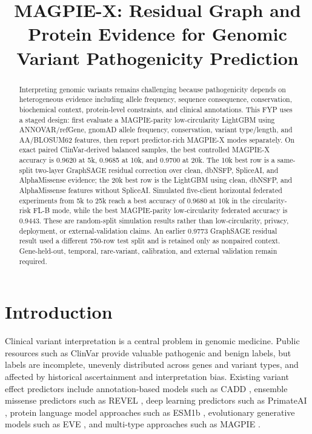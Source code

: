 \documentclass[conference]{IEEEtran}
\title{MAGPIE-X: Residual Graph and Protein Evidence for Genomic Variant Pathogenicity Prediction}
\author{
\IEEEauthorblockN{Omar}
\IEEEauthorblockA{Final Year Project Draft\\
Department / University Name\\
Email: student@example.com}
}
\begin{document}
\maketitle

\begin{abstract}
Interpreting genomic variants remains challenging because pathogenicity depends on heterogeneous evidence including allele frequency, sequence consequence, conservation, biochemical context, protein-level constraints, and clinical annotations. This FYP uses a staged design: first evaluate a MAGPIE-parity low-circularity LightGBM using ANNOVAR/refGene, gnomAD allele frequency, conservation, variant type/length, and AA/BLOSUM62 features, then report predictor-rich MAGPIE-X modes separately. On exact paired ClinVar-derived balanced samples, the best controlled MAGPIE-X accuracy is 0.9620 at 5k, 0.9685 at 10k, and 0.9700 at 20k. The 10k best row is a same-split two-layer GraphSAGE residual correction over clean, dbNSFP, SpliceAI, and AlphaMissense evidence; the 20k best row is the LightGBM using clean, dbNSFP, and AlphaMissense features without SpliceAI. Simulated five-client horizontal federated experiments from 5k to 25k reach a best accuracy of 0.9680 at 10k in the circularity-risk FL-B mode, while the best MAGPIE-parity low-circularity federated accuracy is 0.9443. These are random-split simulation results rather than low-circularity, privacy, deployment, or external-validation claims. An earlier 0.9773 GraphSAGE residual result used a different 750-row test split and is retained only as nonpaired context. Gene-held-out, temporal, rare-variant, calibration, and external validation remain required.
\end{abstract}

\section{Introduction}
Clinical variant interpretation is a central problem in genomic medicine. Public resources such as ClinVar provide valuable pathogenic and benign labels, but labels are incomplete, unevenly distributed across genes and variant types, and affected by historical ascertainment and interpretation bias. Existing variant effect predictors include annotation-based models such as CADD \cite{kircher2014cadd}, ensemble missense predictors such as REVEL \cite{ioannidis2016revel}, deep learning predictors such as PrimateAI \cite{sundaram2018primateai}, protein language model approaches such as ESM1b \cite{brandes2023esm1b}, evolutionary generative models such as EVE \cite{frazer2021eve}, and multi-type approaches such as MAGPIE \cite{liu2024magpie}.
\end{document}
